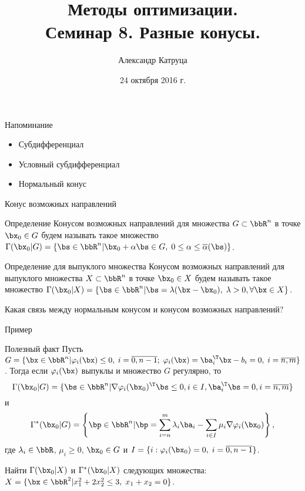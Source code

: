 \documentclass[12pt,russian]{beamer}
\title[Семинар 8]{Методы оптимизации. \\
 Семинар 8. Разные конусы.}
\author{Александр Катруца}
\institute{Московский физико-технический институт,\\
Факультет Управления и Прикладной Математики}
\date{24 октября 2016 г.}
\begin{document}
\begin{frame}
\maketitle
\end{frame}

\begin{frame}{Напоминание}
\begin{itemize}
\item Субдифференциал
\item Условный субдифференциал
\item Нормальный конус
\end{itemize}
\end{frame}

\begin{frame}{Конус возможных направлений}

\begin{block}{Определение}
Конусом возможных направлений для множества $G \subset \bbR^n$ в точке $\bx_0 \in G$ будем называть такое множество $\Gamma(\bx_0 | G) = \{ \bs \in \bbR^n | \bx_0 + \alpha\bs \in G, \; 0 \leq \alpha \leq \overline{\alpha}(\bs) \}$.
\end{block}

\begin{block}{Определение для выпуклого множества}
Конусом возможных направлений для выпуклого множества $X \subset \bbR^n$ в точке $\bx_0 \in X$ будем называть такое множество $\Gamma(\bx_0 | X) = \{ \bs \in \bbR^n | \bs = \lambda (\bx - \bx_0), \; \lambda > 0, \forall \bx \in X \}$.
\end{block}
Какая связь между нормальным конусом и конусом возможных направлений?

\end{frame}

\begin{frame}{Пример}
\begin{block}{Полезный факт}
Пусть $G = \{ \bx \in \bbR^n | \varphi_i(\bx) \leq 0, \; i = \overline{0,n-1}; \; \varphi_i(\bx) = \ba_i^{\T}\bx - b_i = 0, \; i = \overline{n, m} \}$. Тогда если $\varphi_i(\bx)$ выпуклы и множество $G$ регулярно, то \vspace{-4mm}
\[
\Gamma(\bx_0|G) = \{ \bs \in \bbR^n | \nabla \varphi_i(\bx_0)^{\T} \bs \leq 0, i \in I, \ba^{\T}_i \bs = 0, i = \overline{n,m} \}
\vspace{-4mm}
\]
и \vspace{-4mm}
\[
\Gamma^*(\bx_0|G) = \left \{ \bp \in \bbR^n | \bp = \sum\limits_{i = n}^m \lambda_i\ba_i - \sum\limits_{i \in I} \mu_i \nabla\varphi_i(\bx_0) \right \},
\vspace{-4mm}
\]
где $\lambda_i \in \bbR$, $\mu_i \geq 0$, $\bx_0 \in G$ и $I = \{i: \varphi_i(\bx_0) = 0, \; i = \overline{0,n-1}\}$.
\end{block}
Найти $\Gamma(\bx_0|X)$ и $\Gamma^*(\bx_0|X)$ следующих множества:
$X = \{ \bx \in \bbR^2 | x^2_1 + 2x^2_2 \leq 3, \; x_1 + x_2 = 0 \}$.
\end{frame}
\end{document}
